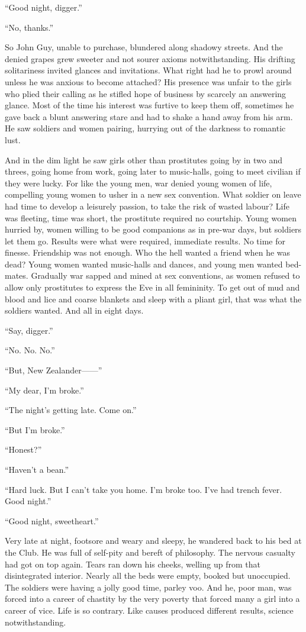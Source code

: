 ``Good night, digger.''

``No, thanks.''

So John Guy, unable to purchase, blundered along shadowy streets. And the denied grapes grew sweeter and not sourer axioms notwithstanding. His drifting solitariness invited glances and invitations. What right had he to prowl around unless he was anxious to become attached? His presence was unfair to the girls who plied their calling as he stifled hope of business by scarcely an answering glance. Most of the time his interest was furtive to keep them off, sometimes he gave back a blunt answering stare and had to shake a hand away from his arm. He saw soldiers and women pairing, hurrying out of the darkness to romantic lust.

And in the dim light he saw girls other than prostitutes going by in two and threes, going home from work, going later to music-halls, going to meet civilian if they were lucky. For like the young men, war denied young women of life, compelling young women to usher in a new sex convention. What soldier on leave had time to develop a leisurely passion, to take the risk of wasted labour? Life was fleeting, time was short, the prostitute required no courtship. Young women hurried by, women willing to be good companions as in pre-war days, but soldiers let them go. Results were what were required, immediate results. No time for finesse. Friendship was not enough. Who the hell wanted a friend when he was dead? Young women wanted music-halls and dances, and young men wanted bed-mates. Gradually war sapped and mined at sex conventions, as women refused to allow only prostitutes to express the Eve in all femininity. To get out of mud and blood and lice and coarse blankets and sleep with a pliant girl, that was what the soldiers wanted. And all in eight days.

``Say, digger.''

``No. No. No.''

``But, New Zealander------''

``My dear, I'm broke.''

``The night's getting late. Come on.''

``But I'm broke.''

``Honest?''

``Haven't a bean.''

``Hard luck. But I can't take you home. I'm broke too. I've had trench fever. Good night.''

``Good night, sweetheart.''

Very late at night, footsore and weary and sleepy, he wandered back to his bed at the Club. He was full of self-pity and bereft of philosophy. The nervous casualty had got on top again. Tears ran down his cheeks, welling up from that disintegrated interior. Nearly all the beds were empty, booked but unoccupied. The soldiers were having a jolly good time, parley voo. And he, poor man, was forced into a career of chastity by the very poverty that forced many a girl into a career of vice. Life is so contrary. Like causes produced different results, science notwithstanding.
